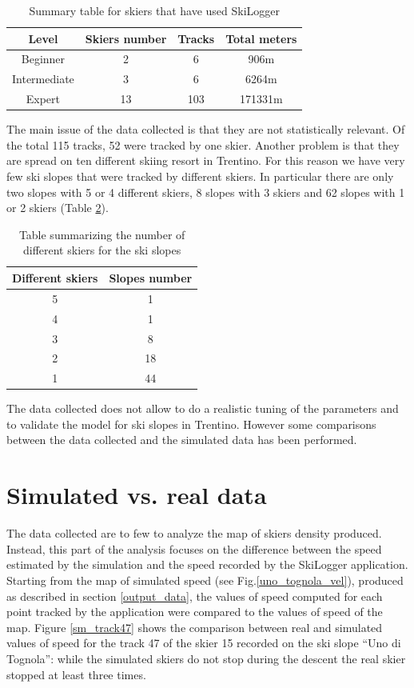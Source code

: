 \documentclass[12pt,a4paper,twoside]{book}
\begin{document}
\begin{table}[!h]
  \centering
  \begin{tabular}{ | c | c | c | c | }
    \hline
    Level & Skiers number & Tracks & Total meters \\
    \hline
    Beginner & 2  & 6 & 906m \\
    Intermediate & 3 & 6 & 6264m \\
    Expert & 13 & 103 & 171331m \\
    \hline
  \end{tabular}
  \caption{Summary table for skiers that have used SkiLogger}
  \label{skiers}
\end{table}

The main issue of the data collected is that they are not statistically relevant. Of the total 115 tracks, 52 were tracked by one skier. Another problem is that they are spread on ten different skiing resort in Trentino. For this reason we have very few ski slopes that were tracked by different skiers. In particular there are only two slopes with 5 or 4 different skiers, 8 slopes with 3 skiers and 62 slopes with 1 or 2 skiers (Table \ref{slopes}).

\begin{table}[!h]
  \centering
  \begin{tabular}{ | c | c | }
    \hline
    Different skiers & Slopes number \\
    \hline
    5 & 1 \\
    4 & 1 \\
    3 & 8 \\
    2 & 18 \\
    1 & 44 \\
    \hline
  \end{tabular}
  \caption{Table summarizing the number of different skiers for the ski slopes}
  \label{slopes}
\end{table}

The data collected does not allow to do a realistic tuning of the parameters and to validate the model for ski slopes in Trentino. However some comparisons between the data collected and the simulated data has been performed.

\section{Simulated vs. real data}
The data collected are to few to analyze the map of skiers density produced. Instead, this part of the analysis focuses on the difference between the speed estimated by the simulation and the speed recorded by the SkiLogger application. Starting from the map of simulated speed (see Fig.\ref{uno_tognola_vel}), produced as described in section \ref{output_data}, the values of speed computed for each point tracked by the application were compared to the values of speed of the map. Figure \ref{sm_track47} shows the comparison between real and simulated values of speed for the track 47 of the skier 15 recorded on the ski slope ``Uno di Tognola'': while the simulated skiers do not stop during the descent the real skier stopped at least three times.
\end{document}
